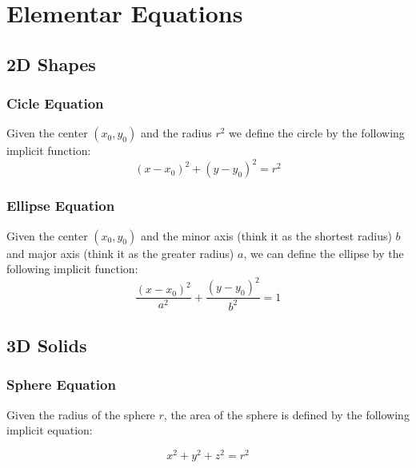 \appendix
\chapter{Elementar Equations}

\section{2D Shapes}

\subsection{Cicle Equation}
Given the center $(x_{0}, y_{0})$ and the radius $r^{2}$ we define the circle by the following implicit function:
\begin{equation*}
    (x - x_{0})^{2} + (y - y_{0})^{2} = r^{2}
\end{equation*}

\subsection{Ellipse Equation}
Given the center $(x_{0}, y_{0})$ and the minor axis (think it as the shortest radius) $b$ and major axis (think it as the greater radius) $a$, we can define the ellipse by the following implicit function:
\begin{equation*}
    \frac{(x - x_{0})^{2}}{a^{2}} + \frac{(y - y_{0})^{2}}{b^{2}} = 1
\end{equation*}

\section{3D Solids}

\subsection{Sphere Equation}
Given the radius of the sphere $r$, the area of the sphere is defined by the following implicit equation:

\begin{equation*}
    x^{2} + y^{2} + z^{2} = r^{2}
\end{equation*}

